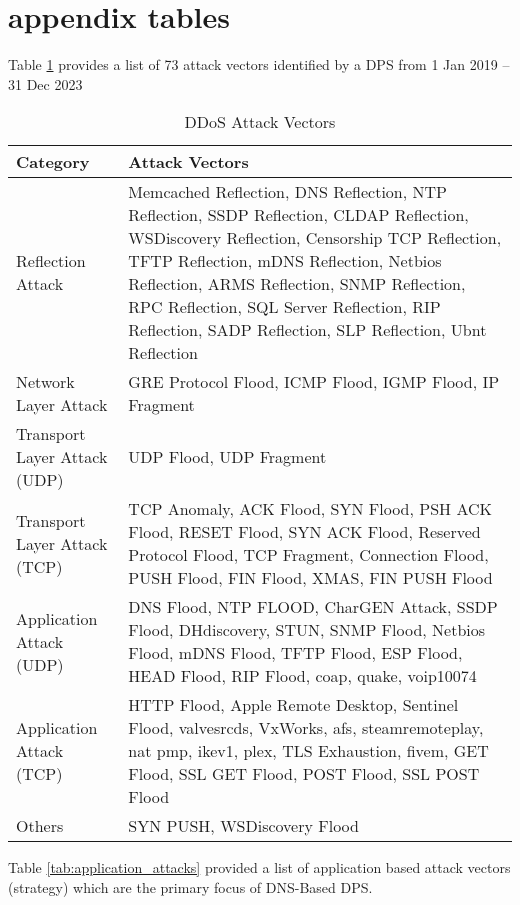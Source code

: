 \section{appendix tables}\label{sec:tables}
Table \ref{tab:ddos_attack_vectors} provides a list of 73 attack vectors identified by a DPS from 1 Jan 2019 – 31 Dec 2023


\begin{table}[!htbp]
\caption{DDoS Attack Vectors}
\label{tab:ddos_attack_vectors}
\centering
\begin{tabular}{|>{\raggedright\arraybackslash}p{2.7cm}|>{\raggedright\arraybackslash}p{4.8cm}|}
\hline
\textbf{Category} & \textbf{Attack Vectors} \\
\hline
Reflection Attack & Memcached Reflection, DNS Reflection, NTP Reflection, SSDP Reflection, CLDAP Reflection, WSDiscovery Reflection, Censorship TCP Reflection, TFTP Reflection, mDNS Reflection, Netbios Reflection, ARMS Reflection, SNMP Reflection, RPC Reflection, SQL Server Reflection, RIP Reflection, SADP Reflection, SLP Reflection, Ubnt Reflection \\
\hline
Network Layer Attack & GRE Protocol Flood, ICMP Flood, IGMP Flood, IP Fragment \\
\hline
Transport Layer Attack (UDP) & UDP Flood, UDP Fragment \\
\hline
Transport Layer Attack (TCP) & TCP Anomaly, ACK Flood, SYN Flood, PSH ACK Flood, RESET Flood, SYN ACK Flood, Reserved Protocol Flood, TCP Fragment, Connection Flood, PUSH Flood, FIN Flood, XMAS, FIN PUSH Flood \\
\hline
Application Attack (UDP) & DNS Flood, NTP FLOOD, CharGEN Attack, SSDP Flood, DHdiscovery, STUN, SNMP Flood, Netbios Flood, mDNS Flood, TFTP Flood, ESP Flood, HEAD Flood, RIP Flood, coap, quake, voip10074 \\
\hline
Application Attack (TCP) & HTTP Flood, Apple Remote Desktop, Sentinel Flood, valvesrcds, VxWorks, afs, steamremoteplay, nat pmp, ikev1, plex, TLS Exhaustion, fivem, GET Flood, SSL GET Flood, POST Flood, SSL POST Flood \\
\hline
Others & SYN PUSH, WSDiscovery Flood \\
\hline
\end{tabular}
\end{table}

Table \ref{tab:application_attacks} provided a list of application based attack vectors (strategy) \cite{zolotukhin2018data} which are the primary focus of DNS-Based DPS.

